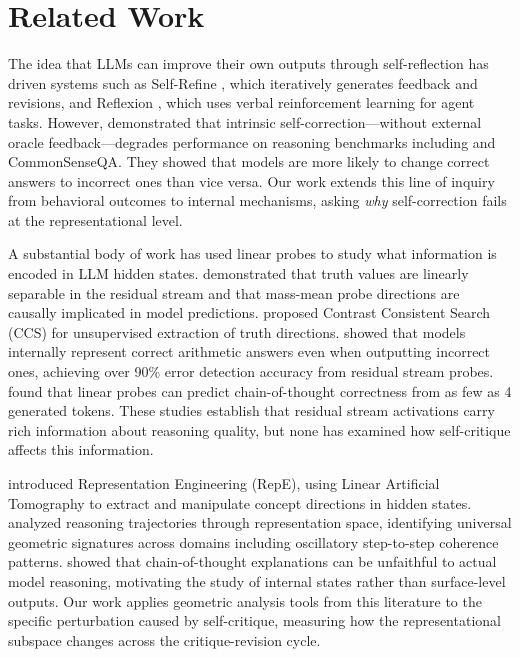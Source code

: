 \section{Related Work}
\label{sec:related}

The idea that LLMs can improve their own outputs through self-reflection has driven systems such as Self-Refine \cite{madaan2023selfrefine}, which iteratively generates feedback and revisions, and Reflexion \cite{shinn2023reflexion}, which uses verbal reinforcement learning for agent tasks. However, \citet{huang2024selfcorrect} demonstrated that intrinsic self-correction---without external oracle feedback---degrades performance on reasoning benchmarks including \gsmk and CommonSenseQA. They showed that models are more likely to change correct answers to incorrect ones than vice versa. Our work extends this line of inquiry from behavioral outcomes to internal mechanisms, asking \emph{why} self-correction fails at the representational level.

A substantial body of work has used linear probes to study what information is encoded in LLM hidden states. \citet{marks2024geometry} demonstrated that truth values are linearly separable in the residual stream and that mass-mean probe directions are causally implicated in model predictions. \citet{burns2023discovering} proposed Contrast Consistent Search (CCS) for unsupervised extraction of truth directions. \citet{garner2025probing} showed that models internally represent correct arithmetic answers even when outputting incorrect ones, achieving over 90\% error detection accuracy from residual stream probes. \citet{david2025temporal} found that linear probes can predict chain-of-thought correctness from as few as 4 generated tokens. These studies establish that residual stream activations carry rich information about reasoning quality, but none has examined how self-critique affects this information.

\citet{zou2023representation} introduced Representation Engineering (RepE), using Linear Artificial Tomography to extract and manipulate concept directions in hidden states. \citet{anderson2026geometry} analyzed reasoning trajectories through representation space, identifying universal geometric signatures across domains including oscillatory step-to-step coherence patterns. \citet{turpin2024unfaithful} showed that chain-of-thought explanations can be unfaithful to actual model reasoning, motivating the study of internal states rather than surface-level outputs. Our work applies geometric analysis tools from this literature to the specific perturbation caused by self-critique, measuring how the representational subspace changes across the critique-revision cycle.

